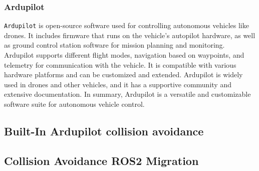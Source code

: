 \subsubsection{Ardupilot}
\texttt{Ardupilot} is open-source software used for controlling autonomous vehicles like drones. It includes firmware that runs on the vehicle's autopilot hardware, as well as ground control station software for mission planning and monitoring.
Ardupilot supports different flight modes, navigation based on waypoints, and telemetry for communication with the vehicle. It is compatible with various hardware platforms and can be customized and extended.
Ardupilot is widely used in drones and other vehicles, and it has a supportive community and extensive documentation. In summary, Ardupilot is a versatile and customizable software suite for autonomous vehicle control.

\subsection{Built-In Ardupilot collision avoidance}

\subsection{Collision Avoidance ROS2 Migration}
